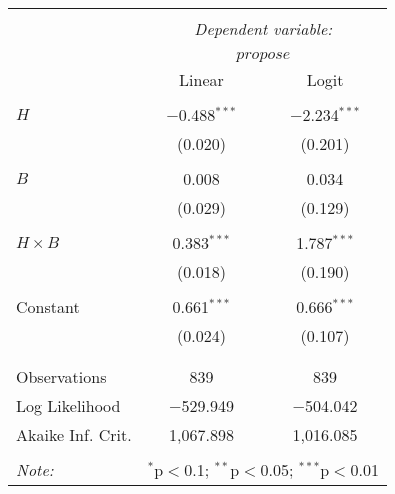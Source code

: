 
\begin{tabular}{@{\extracolsep{5pt}}lcc} 
\\[-1.8ex]\hline 
\hline \\[-1.8ex] 
 & \multicolumn{2}{c}{\textit{Dependent variable:}} \\ 
\cline{2-3} 
\\[-1.8ex] & \multicolumn{2}{c}{$propose$} \\ 
 & Linear & Logit \\ 
\hline \\[-1.8ex] 
 $H$ & $-$0.488$^{***}$ & $-$2.234$^{***}$ \\ 
  & (0.020) & (0.201) \\ 
  & & \\ 
 $B$ & 0.008 & 0.034 \\ 
  & (0.029) & (0.129) \\ 
  & & \\ 
 $H\times B$ & 0.383$^{***}$ & 1.787$^{***}$ \\ 
  & (0.018) & (0.190) \\ 
  & & \\ 
 Constant & 0.661$^{***}$ & 0.666$^{***}$ \\ 
  & (0.024) & (0.107) \\ 
  & & \\ 
\hline \\[-1.8ex] 
Observations & 839 & 839 \\ 
Log Likelihood & $-$529.949 & $-$504.042 \\ 
Akaike Inf. Crit. & 1,067.898 & 1,016.085 \\ 
\hline 
\hline \\[-1.8ex] 
\textit{Note:}  & \multicolumn{2}{r}{$^{*}$p$<$0.1; $^{**}$p$<$0.05; $^{***}$p$<$0.01} \\ 
\end{tabular} 
